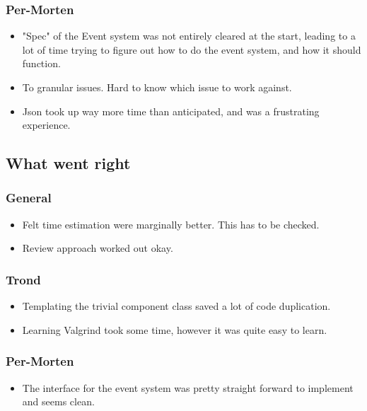 \documentclass{article}
\begin{document}
\subsubsection*{Per-Morten}
\begin{itemize}
    \item
    "Spec" of the Event system was not entirely cleared at the start, leading to a lot of time trying to figure out how to do the event system, and how it should function.

    \item
    To granular issues. Hard to know which issue to work against.

    \item
    Json took up way more time than anticipated, and was a frustrating experience.
\end{itemize}

\subsection*{What went right}
\subsubsection*{General}
\begin{itemize}
    \item
    Felt time estimation were marginally better. This has to be checked.

    \item
    Review approach worked out okay. 
\end{itemize}

\subsubsection*{Trond}
\begin{itemize}
    \item 
    Templating the trivial component class saved a lot of code duplication.

    \item
    Learning Valgrind took some time, however it was quite easy to learn.
\end{itemize}

\subsubsection*{Per-Morten}
\begin{itemize}
    \item
    The interface for the event system was pretty straight forward to implement and seems clean.
\end{itemize}
\end{document}
